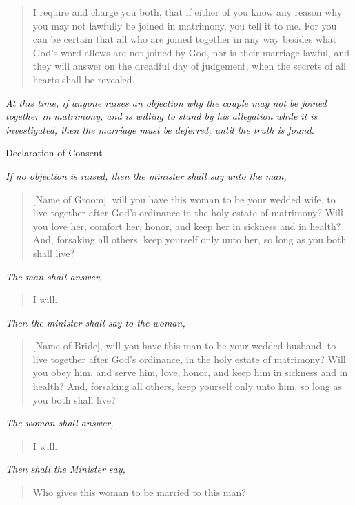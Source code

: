 \documentclass[
]{book}
\begin{document}
\begin{quote}
I require and charge you both, that if either of you know any reason why you may not lawfully be joined in matrimony, you tell it to me. For you can be certain that all who are joined together in any way besides what God's word allows are not joined by God, nor is their marriage lawful, and they will answer on the dreadful day of judgement, when the secrets of all hearts shall be revealed.
\end{quote}

\emph{At this time, if anyone raises an objection why the couple may not be joined together in matrimony, and is willing to stand by his allegation while it is investigated, then the marriage must be deferred, until the truth is found.}

Declaration of Consent

\emph{If no objection is raised, then the minister shall say unto the man,}

\begin{quote}
{[}Name of Groom{]}, will you have this woman to be your wedded wife, to live together after God's ordinance in the holy estate of matrimony? Will you love her, comfort her, honor, and keep her in sickness and in health? And, forsaking all others, keep yourself only unto her, so long as you both shall live?
\end{quote}

\emph{The man shall answer,}

\begin{quote}
I will.
\end{quote}

\emph{Then the minister shall say to the woman,}

\begin{quote}
{[}Name of Bride{]}, will you have this man to be your wedded husband, to live together after God's ordinance, in the holy estate of matrimony? Will you obey him, and serve him, love, honor, and keep him in sickness and in health? And, forsaking all others, keep yourself only unto him, so long as you both shall live?
\end{quote}

\emph{The woman shall answer,}

\begin{quote}
I will.
\end{quote}

\emph{Then shall the Minister say,}

\begin{quote}
Who gives this woman to be married to this man?
\end{quote}
\end{document}
